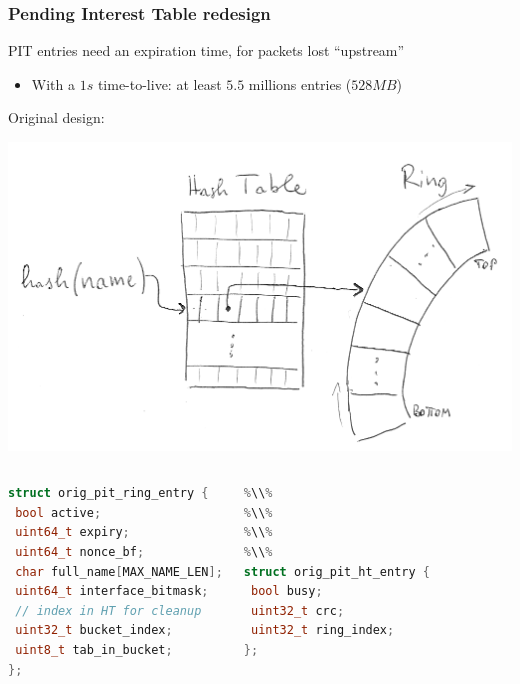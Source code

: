 \begin{frame}[fragile]
  \frametitle{Pending Interest Table redesign}
  PIT entries need an expiration time, for packets lost ``upstream''
  \vspace{-6pt}
  \begin{itemize}
    \item With a $1 s$ time-to-live: at least $5.5$ millions entries ($528 MB$)
  \end{itemize}
  Original design:
  \vspace{-1.2cm}
  \begin{flushright}
    \includegraphics[width=.7\linewidth]{img/old_pit_sketch_trans.png}
  \end{flushright}
  \vspace{-2.7cm}
  \begin{columns}[t]
    \begin{lstlisting}[language=c,escapechar=\%]
struct orig_pit_ring_entry {
 bool active;
 uint64_t expiry;
 uint64_t nonce_bf;
 char full_name[MAX_NAME_LEN];
 uint64_t interface_bitmask;
 // index in HT for cleanup
 uint32_t bucket_index;
 uint8_t tab_in_bucket;
};
    \end{lstlisting}
    \begin{lstlisting}[language=c,escapechar=\%]
%\\%
%\\%
%\\%
%\\%
%\\%
struct orig_pit_ht_entry {
 bool busy;
 uint32_t crc;
 uint32_t ring_index;
};
    \end{lstlisting}
  \end{columns}
\end{frame}

\extraslidesend



              
